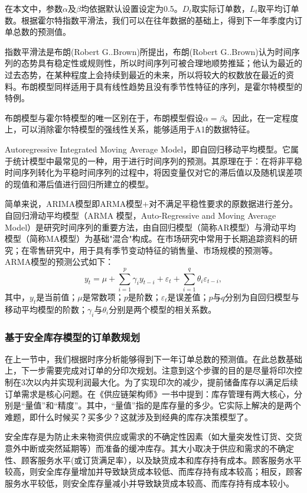 \documentclass[bwprint]{gmcmthesis}
\begin{document}
在本文中，参数$\alpha$及$\beta$均依据默认设置设定为0.5。$D_t$取实际订单数，$L_t$取平均订单数。根据霍尔特指数平滑法，我们可以在往年数据的基础上，得到下一年季度内订单总数的预测值。


指数平滑法是布朗(Robert G..Brown)所提出，布朗(Robert G..Brown)认为时间序列的态势具有稳定性或规则性，所以时间序列可被合理地顺势推延；他认为最近的过去态势，在某种程度上会持续到最近的未来，所以将较大的权数放在最近的资料。布朗模型同样适用于具有线性趋势且没有季节性特征的序列，是霍尔特模型的特例。

布朗模型与霍尔特模型的唯一区别在于，布朗模型假设$\alpha=\beta$。因此，在一定程度上，可以消除霍尔特模型的强线性关系，能够适用于A1的数据特征。

Autoregressive Integrated Moving Average Model，即自回归移动平均模型。它属于统计模型中最常见的一种，用于进行时间序列的预测。其原理在于：在将非平稳时间序列转化为平稳时间序列的过程中，将因变量仅对它的滞后值以及随机误差项的现值和滞后值进行回归所建立的模型。

简单来说，ARIMA模型即ARMA模型+对不满足平稳性要求的原数据进行差分。自回归滑动平均模型（ARMA 模型，Auto-Regressive and Moving Average Model）是研究时间序列的重要方法，由自回归模型（简称AR模型）与滑动平均模型（简称MA模型）为基础"混合"构成。在市场研究中常用于长期追踪资料的研究；在零售研究中，用于具有季节变动特征的销售量、市场规模的预测等。ARMA模型的预测公式如下：
\begin{equation}
\label{eq:arma}
  y_t = \mu + \sum_{i=1}^{p}\gamma_i y_{t-i} + \varepsilon_t + \sum_{i=1}^{q}\theta_i \varepsilon_{t-i},
\end{equation}
其中，$y_t$是当前值；$\mu$是常数项；$p$是阶数；$\varepsilon_t$是误差值；$p$与$q$分别为自回归模型与移动平均模型的阶数；$\gamma_i$与$\theta_i$分别是两个模型的相关系数。

\subsubsection{基于安全库存模型的订单数规划}

在上一节中，我们根据时序分析能够得到下一年订单总数的预测值。在此总数基础上，下一步需要完成对订单的分印次规划。注意到这个步骤的目的是尽量将印次控制在3次以内并实现利润最大化。为了实现印次的减少，提前储备库存以满足后续订单需求是核心问题。在《供应链架构师》一书中提到：库存管理有两大核心，分别是“量值”和“精度”。其中，“量值”指的是库存量的多少。它实际上解决的是两个难题，即什么时候买？买多少？这就涉及到经典的库存决策模型了。

安全库存是为防止未来物资供应或需求的不确定性因素（如大量突发性订货、交货意外中断或突然延期等）而准备的缓冲库存。其大小取决于供应和需求的不确定性、顾客服务水平(或订货满足率），以及缺货成本和库存持有成本。顾客服务水平较高，则安全库存量增加并导致缺货成本较低、而库存持有成本较高；相反，顾客服务水平较低，则安全库存量减小并导致缺货成本较高、而库存持有成本较小。
\end{document}

